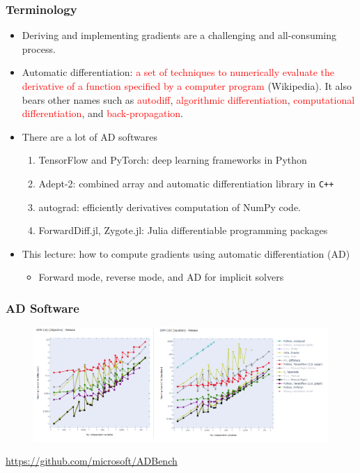 \documentclass{beamer}
\newcommand{\red}[1]{\textcolor{red}{#1}}
\begin{document}
\begin{frame}
	\frametitle{Terminology}

	\begin{itemize}

		\item Deriving and implementing gradients are a challenging and all-consuming process.

		\item Automatic differentiation: \red{a set of techniques to numerically evaluate the derivative of a function specified by a computer program} (Wikipedia). It also bears other names such as \red{autodiff}, \red{algorithmic differentiation}, \red{computational differentiation}, and \red{back-propagation}.


		\item There are a lot of AD softwares
		      \begin{enumerate}
			      \item TensorFlow and PyTorch: deep learning frameworks in Python
			      \item Adept-2: combined array and automatic differentiation library in \texttt{C++}
			      \item autograd: efficiently derivatives computation of NumPy code.
			      \item ForwardDiff.jl, Zygote.jl: Julia differentiable programming packages
		      \end{enumerate}


		\item This lecture: how to compute gradients using automatic differentiation (AD)

		      \begin{itemize}
			      \item  Forward mode, reverse mode, and AD for implicit solvers
		      \end{itemize}




	\end{itemize}
\end{frame}

\begin{frame}
	\frametitle{AD Software}

	\begin{figure}[hbt]
		\includegraphics[width=1.0\textwidth]{figures/ad_performance}
	\end{figure}

	{\scriptsize \url{https://github.com/microsoft/ADBench}}

\end{frame}
\end{document}
